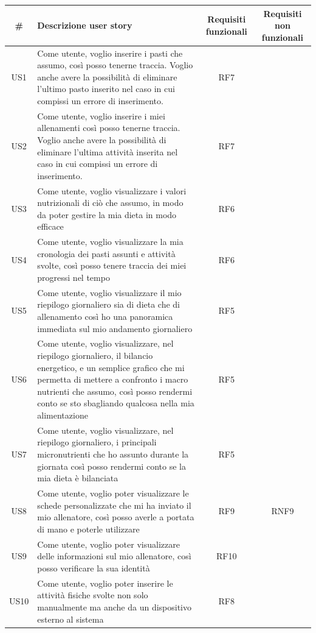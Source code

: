 \documentclass{article}
\begin{document}
   \begin{center}
      \begin{tabular}{|c|p{10cm}|c|c|}
         \hline
         \# & Descrizione user story & Requisiti funzionali & Requisiti non funzionali\\
         \hline
         US1 & Come utente, voglio inserire i pasti che assumo, così posso tenerne traccia. Voglio anche avere la possibilità di eliminare l’ultimo pasto inserito nel caso in cui compissi un errore di inserimento. & RF7 &\\
         \hline
         US2 & Come utente, voglio inserire i miei allenamenti così posso tenerne traccia. Voglio anche avere la possibilità di eliminare l’ultima attività inserita nel caso in cui compissi un errore di inserimento. & RF7 & \\
         \hline
         US3 & Come utente, voglio visualizzare i valori nutrizionali di ciò che assumo, in modo da poter gestire la mia dieta in modo efficace & RF6 &\\
         \hline
         US4 & Come utente, voglio visualizzare la mia cronologia dei pasti assunti e attività svolte, così posso tenere traccia dei miei progressi nel tempo & RF6 & \\
         \hline
         US5 & Come utente, voglio visualizzare il mio riepilogo giornaliero sia di dieta che di allenamento così ho una panoramica immediata sul mio andamento giornaliero & RF5 & \\
         \hline
         US6 & Come utente, voglio visualizzare, nel riepilogo giornaliero, il bilancio energetico, e un semplice grafico che mi permetta di mettere a confronto i macro nutrienti che assumo, così posso rendermi conto se sto sbagliando qualcosa nella mia alimentazione & RF5 & \\
         \hline
         US7 & Come utente, voglio visualizzare, nel riepilogo giornaliero, i principali micronutrienti che ho assunto durante la giornata così posso rendermi conto se la mia dieta è bilanciata & RF5 & \\
         \hline
         US8 & Come utente, voglio poter visualizzare le schede personalizzate che mi ha inviato il mio allenatore, così posso averle a portata di mano e poterle utilizzare & RF9 & RNF9\\
         \hline
         US9 & Come utente, voglio poter visualizzare delle informazioni sul mio allenatore, così posso verificare la sua identità & RF10 & \\
         \hline
         US10 & Come utente, voglio poter inserire le attività fisiche svolte non solo manualmente ma anche da un dispositivo esterno al sistema & RF8 & \\
         \hline
      \end{tabular}
   \end{center}
\end{document}
